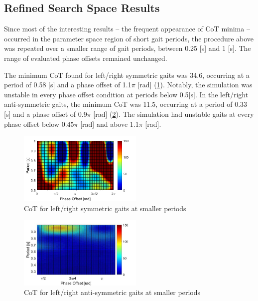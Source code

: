 \documentclass[conference,11pt,letterpaper]{IEEEtran}
\begin{document}
\subsection{Refined Search Space Results}
Since most of the interesting results -- the frequent appearance of CoT minima -- occurred in the parameter space region of short gait periods, the procedure above was repeated over a smaller range of gait periods, between 0.25 [\si{\s}] and 1 [\si{\s}]. The range of evaluated phase offsets remained unchanged.

The minimum CoT found for left/right symmetric gaits was 34.6, occurring at a period of 0.58 [\si{\s}] and a phase offset of 1.1$\pi$ [\si{\radian}] (\cref{fig:sync_gait_2}). Notably, the simulation was unstable in every phase offset condition at periods below 0.5[\si{\s}]. In the left/right anti-symmetric gaits, the minimum CoT was 11.5, occurring at a period of 0.33 [\si{\s}] and a phase offset of 0.9$\pi$ [\si{\radian}] (\cref{fig:unsync_gait_2}). The simulation had unstable gaits at every phase offset below 0.45$\pi$ [\si{\radian}] and above 1.1$\pi$ [\si{\radian}]. 
\begin{figure}[ht!]
         
           \includegraphics[width=0.53\textwidth]{sync}
           \caption{CoT for left/right symmetric gaits at smaller periods}
           \label{fig:sync_gait_2}
           \end{figure}
           
          \begin{figure}[ht!]
           \includegraphics[width=0.53\textwidth]{unsync}
           \caption{CoT for left/right anti-symmetric gaits at smaller periods}
           \label{fig:unsync_gait_2}
\end{figure}
           
\end{document}
